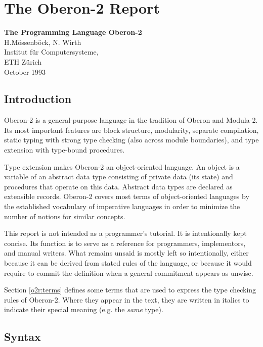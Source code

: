\chapter{The Oberon-2 Report}\label{o2rep}

\begin{center}
{\large\bf The Programming Language Oberon-2} \\
H.M\"ossenb\"ock, N. Wirth  \\
Institut f\"ur Computersysteme, \\
ETH Z\"urich \\
October 1993 \\
\end{center}

\section{Introduction}

Oberon-2 is a general-purpose language in the tradition of Oberon
and Modula-2. Its most important features are block structure, modularity,
separate compilation, static typing with strong type checking (also
across module boundaries), and type extension with type-bound procedures.

Type extension makes Oberon-2 an object-oriented language. An object
is a variable of an abstract data type consisting of private data
(its state) and procedures that operate on this data. Abstract data
types are declared as extensible records. Oberon-2 covers most terms
of object-oriented languages by the established vocabulary of imperative
languages in order to minimize the number of notions for similar concepts.

This report is not intended as a programmer's tutorial. It is intentionally
kept concise. Its function is to serve as a reference for programmers,
implementors, and manual writers. What remains unsaid is mostly left
so intentionally, either because it can be derived from stated rules
of the language, or because it would require to commit the definition
when a general commitment appears as unwise.

Section \ref{o2r:terms}
defines some terms that are used to express the type
checking rules of Oberon-2. Where they appear in the text, they are
written in italics to indicate their special meaning (e.g. the {\em same}
type).

\section{Syntax}


